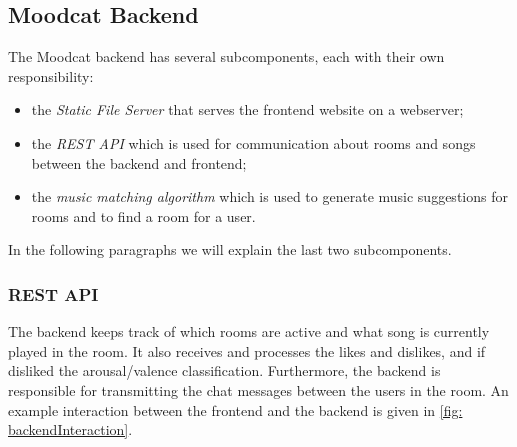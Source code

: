 \subsection{Moodcat Backend}
The Moodcat backend has several subcomponents, each with their own responsibility:
\begin{itemize}
\item the \textit{Static File Server} that serves the frontend website on a webserver;
\item the \textit{REST API} which is used for communication about rooms and songs between the backend and frontend;
\item the \textit{music matching algorithm} which is used to generate music suggestions for rooms and to find a room for a user.
\end{itemize}
In the following paragraphs we will explain the last two subcomponents.

\subsubsection{REST API}
The backend keeps track of which rooms are active and what song is currently played in the room.
It also receives and processes the likes and dislikes, and if disliked the arousal/valence classification.
Furthermore, the backend is responsible for transmitting the chat messages between the users in the room.
An example interaction between the frontend and the backend is given in \ref{fig: backendInteraction}.

